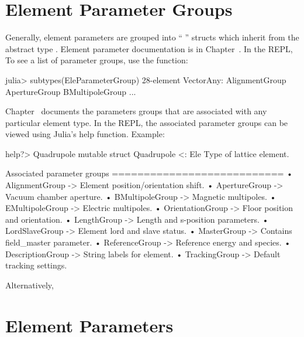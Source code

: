 \section{Element Parameter Groups}
\label{s:ele.groups}

Generally, element parameters are grouped into ``  '' 
structs which inherit from the abstract type . 
Element parameter documentation is in Chapter~. In the REPL,
To see a list of parameter groups, use the  function:
\begin{example}
  julia> subtypes(EleParameterGroup)
  28-element Vector{Any}:
   AlignmentGroup
   ApertureGroup
   BMultipoleGroup
   ...
\end{example}
Chapter~ documents the parameters groups that are associated with any particular element type.
In the REPL, the associated parameter groups can be viewed using Julia's help function. Example: 
\begin{example}
  help?> Quadrupole
    mutable struct Quadrupole <: Ele
    Type of lattice element.

    Associated parameter groups
    ===========================
      •  AlignmentGroup -> Element position/orientation shift.
      •  ApertureGroup -> Vacuum chamber aperture.
      •  BMultipoleGroup -> Magnetic multipoles.
      •  EMultipoleGroup -> Electric multipoles.
      •  OrientationGroup -> Floor position and orientation.
      •  LengthGroup -> Length and s-position parameters.
      •  LordSlaveGroup -> Element lord and slave status.
      •  MasterGroup -> Contains field_master parameter.
      •  ReferenceGroup -> Reference energy and species.
      •  DescriptionGroup -> String labels for element.
      •  TrackingGroup -> Default tracking settings.
\end{example}
Alternatively, 

\section{Element Parameters}
\label{s:ele.params}

